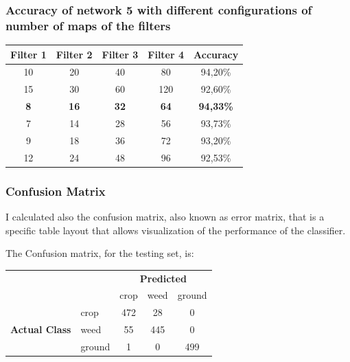\documentclass{beamer}
\begin{document}
\begin{frame}
\frametitle{Accuracy of network 5 with different configurations of number of maps of the filters}
\begin{table} [h]
\begin{center}
\begin{tabular}{|c|c|c|c|c|}
 \hline
 \textbf{Filter 1} & \textbf{Filter 2} & \textbf{Filter 3} & \textbf{Filter 4} & \textbf{Accuracy} \\ \hline
 10 & 20 & 40  & 80  & 94,20\%  \\ \hline
 15 & 30 & 60  & 120  & 92,60\%  \\ \hline
 \textbf{8} & \textbf{16} & \textbf{32}  & \textbf{64}  & \textbf{94,33\%}  \\ \hline
 7 & 14 & 28  & 56  & 93,73\%  \\ \hline
 9 & 18 & 36  & 72  & 93,20\%  \\ \hline
 12 & 24 & 48  & 96  & 92,53\%  \\ \hline
 
\end{tabular}
\end{center} 
\end{table}

\end{frame}

\begin{frame}
\frametitle{Confusion Matrix}

I calculated also the confusion matrix, also known as error matrix, that is a specific table layout that allows visualization of the performance of the classifier.

The Confusion matrix, for the testing set, is:

\begin{table}[h]
\centering

\begin{tabular}{cl|c|c|c|}
\cline{3-5}
\multicolumn{1}{l}{}                                         &        & \multicolumn{3}{c|}{\textbf{Predicted}}                                             \\ \cline{3-5} 
\textbf{}                                                    &        & \multicolumn{1}{l|}{crop} & \multicolumn{1}{l|}{weed} & \multicolumn{1}{l|}{ground} \\ \hline
\multicolumn{1}{|c|}{\multirow{3}{*}{\textbf{Actual Class}}} & crop   & 472                       & 28                        & 0                           \\ \cline{2-5} 
\multicolumn{1}{|c|}{}                                       & weed   & 55                        & 445                       & 0                           \\ \cline{2-5} 
\multicolumn{1}{|c|}{}                                       & ground & 1                         & 0                         & 499                         \\ \hline
\end{tabular}
\end{table} 

\end{frame}
\end{document}
